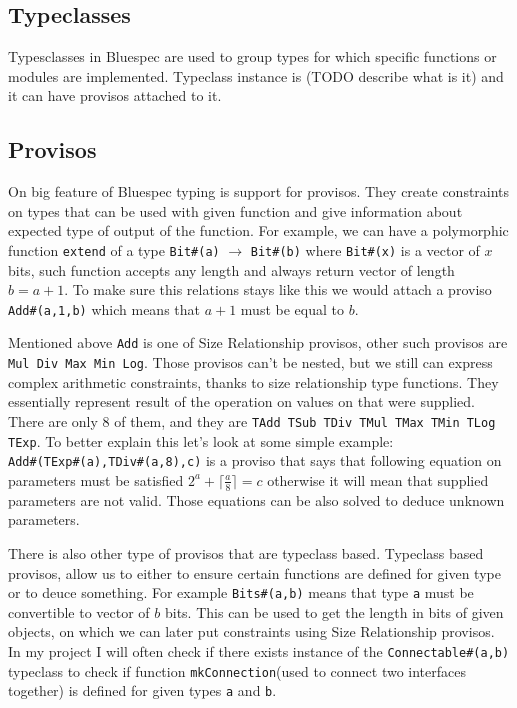 \documentclass[14pt]{report}
\begin{document}
\subsection{Typeclasses}
Typesclasses in Bluespec are used to group types for which specific functions or modules are implemented. Typeclass instance is (TODO describe what is it) and it can have provisos attached to it.

\subsection{Provisos}
On big feature of Bluespec typing is support for provisos. They create constraints on types that can be used with given function and give information about expected type of output of the function. For example, we can have a polymorphic function \verb!extend! of a type \verb!Bit#(a)! $\rightarrow$ \verb!Bit#(b)! where \verb!Bit#(x)! is a vector of $x$ bits, such function accepts any length and always return vector of length $b=a+1$. To make sure this relations stays like this we would attach a proviso \verb!Add#(a,1,b)! which means that $a+1$ must be equal to $b$. 
\par
Mentioned above \verb!Add! is one of Size Relationship provisos, other such provisos are \verb!Mul Div Max Min Log!.
Those provisos can't be nested, but we still can express complex arithmetic constraints, thanks to size relationship type functions.
They essentially represent result of the operation on values on that were supplied. There are only 8 of them, and they are \verb!TAdd TSub TDiv TMul TMax TMin TLog TExp!.
To better explain this let's look at some simple example: \\
\verb!Add#(TExp#(a),TDiv#(a,8),c)! is a proviso that says that following equation on parameters must be satisfied $2^a+\lceil\frac{a}{8}\rceil = c$ otherwise it will mean that supplied parameters are not valid. Those equations can be also solved to deduce unknown parameters.
\par
There is also other type of provisos that are typeclass based.
Typeclass based provisos, allow us to either to ensure certain functions are defined for given type or to deuce something. For example \verb!Bits#(a,b)! means that type \verb!a! must be convertible to vector of $b$ bits. This can be used to get the length in bits of given objects, on which we can later put constraints using Size Relationship provisos.
\\
In my project I will often check if there exists instance of the \verb!Connectable#(a,b)! typeclass to check if function \verb!mkConnection!(used to connect two interfaces together) is defined for given types \verb!a! and \verb!b!.
\end{document}
